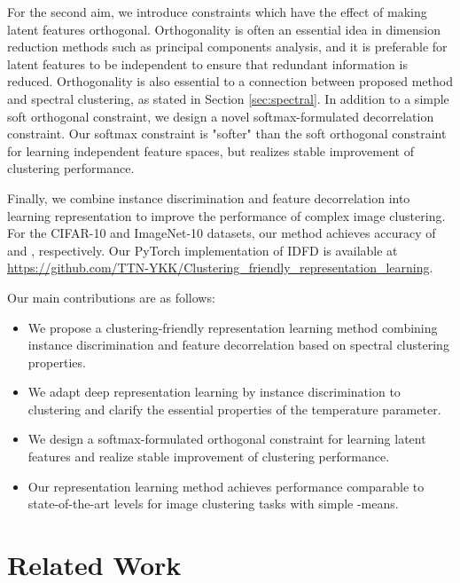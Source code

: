 \documentclass{article} \usepackage{iclr2021_conference,times}
\begin{document}
For the second aim, we introduce constraints which have the effect of making latent features orthogonal. 
Orthogonality is often an essential idea in dimension reduction methods such as principal components analysis,
and it is preferable for latent features to be independent to ensure that redundant information is reduced.
Orthogonality is also essential to a connection between proposed method and spectral clustering, as stated in Section \ref{sec:spectral}.
In addition to a simple soft orthogonal constraint, we design a novel softmax-formulated decorrelation constraint. Our softmax constraint is "softer" than the soft orthogonal constraint for learning independent feature spaces, but realizes stable improvement of clustering performance. 

Finally, we combine instance discrimination and feature decorrelation into learning representation to improve the performance of complex image clustering. 
For the CIFAR-10 and ImageNet-10 datasets, our method achieves accuracy of  and , respectively. Our PyTorch \cite{NEURIPS2019_9015} implementation of IDFD is available
at \url{https://github.com/TTN-YKK/Clustering_friendly_representation_learning}.


Our main contributions are as follows:
\begin{itemize}
\item We propose a clustering-friendly representation learning method combining instance discrimination and feature decorrelation based on spectral clustering properties.
\item We adapt deep representation learning by instance discrimination to clustering and clarify the essential properties of the temperature parameter.
\item We design a softmax-formulated orthogonal constraint for learning latent features and realize stable improvement of clustering performance.
\item Our representation learning method achieves performance comparable to state-of-the-art levels for image clustering tasks with simple -means.
\end{itemize}


\section{Related Work}
\end{document}
